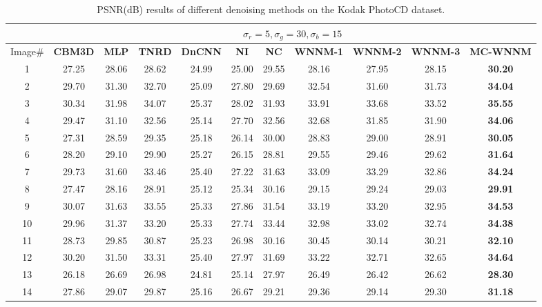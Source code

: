 \vspace{5mm}
\begin{table}[!htbp]
\caption{PSNR(dB) results of different denoising methods on the Kodak PhotoCD dataset.}
\label{tab4-3}
\begin{center}
\renewcommand\arraystretch{1.0}
\scriptsize
\begin{tabular}{|c||c|c|c|c|c|c|c|c|c|c|}
\hline
&\multicolumn{10}{c|}{ $\sigma_{r} = 5, \sigma_{g} = 30, \sigma_{b} = 15$}
\\
\hline
\hline
Image\#
&
\textbf{CBM3D}
&
\textbf{MLP}
&
\textbf{TNRD}
&
\textbf{DnCNN}
&
\textbf{NI}
&
\textbf{NC}
&
\textbf{WNNM-1}
&
\textbf{WNNM-2}
&
\textbf{WNNM-3}
&
\textbf{MC-WNNM}
\\
\hline
1& 27.25 & 28.06 & 28.62 & 24.99 & 25.00 & 29.55 & 28.16 & 27.95 & 28.15 & \textbf{30.20}
\\
\hline
2& 29.70 & 31.30 & 32.70 & 25.09 & 27.80 & 29.69 & 32.54 & 31.60 & 31.73 & \textbf{34.04}
\\
\hline
3& 30.34 & 31.98 & 34.07 & 25.37 & 28.02 & 31.93 & 33.91 & 33.68 & 33.52 & \textbf{35.55}
\\
\hline 
4& 29.47 & 31.10 & 32.56 & 25.14 & 27.70 & 32.56 & 32.68 & 31.85 & 31.90 & \textbf{34.06} 
\\
\hline
5& 27.31 & 28.59 & 29.35 & 25.18 & 26.14 & 30.00 & 28.83 & 29.00 & 28.91 & \textbf{30.05}
\\
\hline
6& 28.20 & 29.10 & 29.90 & 25.27 & 26.15 & 28.81 & 29.55 & 29.46 & 29.62 & \textbf{31.64}
\\
\hline
7& 29.73 & 31.60 & 33.46 & 25.40 & 27.22 & 31.63 & 33.09 & 33.29 & 32.86 & \textbf{34.24} 
\\
\hline
8& 27.47 & 28.16 & 28.91 & 25.12 & 25.34 & 30.16 & 29.15 & 29.24 & 29.03 & \textbf{29.91}
\\
\hline
9& 30.07 & 31.63 & 33.55 & 25.33 & 27.86 & 31.54 & 33.19 & 33.20 & 32.95 & \textbf{34.53}
\\
\hline
10& 29.96 & 31.37 & 33.20 & 25.33 & 27.74 & 33.44 & 32.98 & 33.02 & 32.74 & \textbf{34.38}
\\
\hline
11& 28.73 & 29.85 & 30.87 & 25.23 & 26.98 & 30.16 & 30.45 & 30.14 & 30.21 & \textbf{32.10}
\\
\hline
12& 30.20 & 31.50 & 33.31 & 25.40 & 27.97 & 31.69 & 33.22 & 32.71 & 32.65 & \textbf{34.64}
\\
\hline
13& 26.18 & 26.69 & 26.98 & 24.81 & 25.14 & 27.97 & 26.49 & 26.42 & 26.62 & \textbf{28.30}
\\
\hline
14& 27.86 & 29.07 & 29.87 & 25.16 & 26.67 & 29.21 & 29.36 & 29.14 & 29.30 & \textbf{31.18}

\end{tabular}
\end{center}
\end{table}
